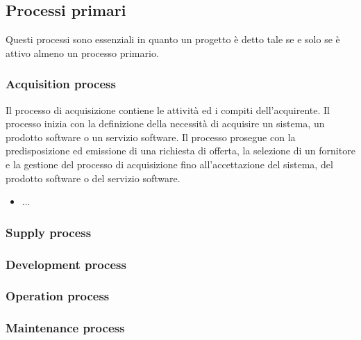 \subsection{Processi primari}
Questi processi sono essenziali in quanto un progetto è detto tale se e solo se è attivo almeno un processo primario.
\subsubsection{Acquisition process}
Il processo di acquisizione contiene le attività ed i compiti dell'acquirente. Il processo inizia con la definizione della necessità di acquisire un sistema, un prodotto software o un servizio software. Il processo prosegue con la predisposizione ed emissione di una richiesta di offerta, la selezione di un fornitore e la gestione del processo di acquisizione fino all'accettazione del sistema, del prodotto software o del servizio software.
\begin{itemize}
\item ...
\end{itemize}
\subsubsection{Supply process}

\subsubsection{Development process}

\subsubsection{Operation process}

\subsubsection{Maintenance process}